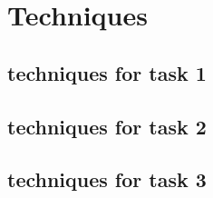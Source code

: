 \section{Techniques}

\subsection{techniques for task 1}

\subsection{techniques for task 2}

\subsection{techniques for task 3}
